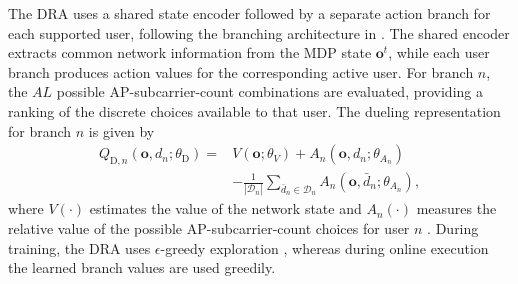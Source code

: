 \documentclass[journal]{IEEEtran}
\begin{document}
The DRA uses a shared state encoder followed by a separate action
branch for each supported user, following the branching architecture
in \cite{Tavakoli2018Branching}. The shared encoder extracts common
network information from the MDP state $\mathbf{o}^{t}$, while each
user branch produces action values for the corresponding active user.
For branch $n$, the $A L$ possible AP-subcarrier-count combinations
are evaluated, providing a ranking of the discrete choices available
to that user. The dueling representation for branch $n$ is given by
\begin{align}
Q_{\mathrm{D},n}(\mathbf{o},d_n;\theta_{\mathrm{D}})
={}&
V(\mathbf{o};\theta_V)
+A_n(\mathbf{o},d_n;\theta_{A_n})
\nonumber\\
&-\frac{1}{|\mathcal{D}_n|}
\sum_{\bar d_n\in\mathcal{D}_n}
A_n(\mathbf{o},\bar d_n;\theta_{A_n}),
\label{eq:dra_dueling_q}
\end{align}
where $V(\cdot)$ estimates the value of the network state and
$A_n(\cdot)$ measures the relative value of the possible
AP-subcarrier-count choices for user $n$
\cite{Wang2016Dueling}. During training, the DRA uses
$\epsilon$-greedy exploration \cite{Mnih2015DQN}, whereas during
online execution the learned branch values are used greedily.
\end{document}
